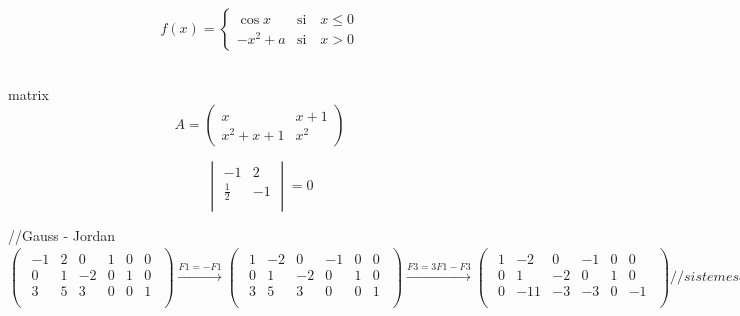 $$f(x) = 
\begin{cases}
\cos x & \text{si } \text{ } x \leq 0\\
-x^2+a  & \text{si } \text{ } x > 0
\end{cases}
$$

\\matrix
$$A = 
\begin{pmatrix}
x & x+1 \\
x^{2}+x+1 & x^{2}
\end{pmatrix}
$$


$$
\begin{vmatrix} 
-1 & 2\\
\frac{1}{2} & -1\\
\end{vmatrix}=0 
$$

//Gauss - Jordan
$$
\begin{pmatrix}
\begin{array}{ccc|ccc}
-1 & 2 & 0 &1&0&0\\
0 & 1 & -2 &0&1&0\\
3&5&3&0&0&1\\
\end{array} 
\end{pmatrix}

\xrightarrow{F1=-F1}

\begin{pmatrix}
\begin{array}{ccc|ccc}
1 & -2 & 0 &-1&0&0\\
0 & 1 & -2 &0&1&0\\
3&5&3&0&0&1\\
\end{array} 
\end{pmatrix}


\xrightarrow{F3=3F1-F3}

\begin{pmatrix}
\begin{array}{ccc|ccc}
1 & -2 & 0 &-1&0&0\\
0 & 1 & -2 &0&1&0\\
0&-11&-3&-3&0&-1\\
\end{array} 
\end{pmatrix}



//sistemes d'equacions
\left. 

\begin{array}{rcl} 
y+(\lambda-1)z& = & \lambda \\ 
(\lambda-1)y +z& = & \lambda \\ 
(\lambda-2)x & = & \lambda+2
\end{array} 

\right\}

$$
